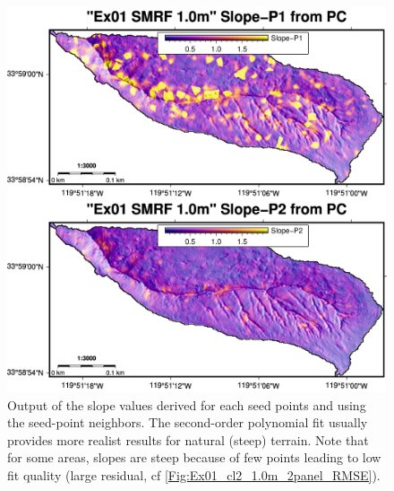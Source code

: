 \documentclass[a4paperpaper,,tablecaptionabove]{scrartcl}
\begin{document}
\begin{figure}
\centering
\includegraphics[width=\textwidth,height=0.9\textheight]{./tex2pdf.-e6884bf2dada0f3b/73fad069247dad484605fc537461f949b78368ca.png}
\caption{Output of the slope values derived for each seed points and
using the seed-point neighbors. The second-order polynomial fit usually
provides more realist results for natural (steep) terrain. Note that for
some areas, slopes are steep because of few points leading to low fit
quality (large residual, cf \ref{Fig:Ex01_cl2_1.0m_2panel_RMSE}).
\label{Fig:Ex01_cl2_1.0m_2panel_SLPs}}
\end{figure}
\end{document}
